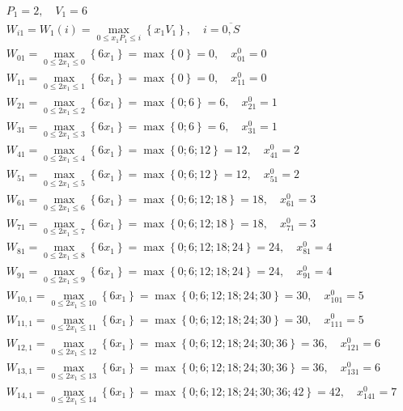 \begin{align*}
     & P_1 = 2, \quad V_1 = 6                                                                                                                         \\
     & W_{i1} = W_1(i) = \max\limits_{0 \leq x_1P_1 \leq i} \left\{x_1V_1\right\}, \quad i = \overline{0, S}                                          \\
     & W_{01} = \max\limits_{0 \leq 2x_1 \leq 0} \left\{6x_1\right\} = \max \left\{0\right\} = 0, \quad x_{01}^0 = 0                                  \\
     & W_{11} = \max\limits_{0 \leq 2x_1 \leq 1} \left\{6x_1\right\} = \max \left\{0\right\} = 0, \quad x_{11}^0 = 0                                  \\
     & W_{21} = \max\limits_{0 \leq 2x_1 \leq 2} \left\{6x_1\right\} = \max \left\{0; 6\right\} = 6, \quad x_{21}^0 = 1                               \\
     & W_{31} = \max\limits_{0 \leq 2x_1 \leq 3} \left\{6x_1\right\} = \max \left\{0; 6\right\} = 6, \quad x_{31}^0 = 1                               \\
     & W_{41} = \max\limits_{0 \leq 2x_1 \leq 4} \left\{6x_1\right\} = \max \left\{0; 6; 12\right\} = 12, \quad x_{41}^0 = 2                          \\
     & W_{51} = \max\limits_{0 \leq 2x_1 \leq 5} \left\{6x_1\right\} = \max \left\{0; 6; 12\right\} = 12, \quad x_{51}^0 = 2                          \\
     & W_{61} = \max\limits_{0 \leq 2x_1 \leq 6} \left\{6x_1\right\} = \max \left\{0; 6; 12; 18\right\} = 18, \quad x_{61}^0 = 3                      \\
     & W_{71} = \max\limits_{0 \leq 2x_1 \leq 7} \left\{6x_1\right\} = \max \left\{0; 6; 12; 18\right\} = 18, \quad x_{71}^0 = 3                      \\
     & W_{81} = \max\limits_{0 \leq 2x_1 \leq 8} \left\{6x_1\right\} = \max \left\{0; 6; 12; 18; 24\right\} = 24, \quad x_{81}^0 = 4                  \\
     & W_{91} = \max\limits_{0 \leq 2x_1 \leq 9} \left\{6x_1\right\} = \max \left\{0; 6; 12; 18; 24\right\} = 24, \quad x_{91}^0 = 4                  \\
     & W_{10, 1} = \max\limits_{0 \leq 2x_1 \leq 10} \left\{6x_1\right\} = \max \left\{0; 6; 12; 18; 24; 30\right\} = 30, \quad x_{101}^0 = 5         \\
     & W_{11, 1} = \max\limits_{0 \leq 2x_1 \leq 11} \left\{6x_1\right\} = \max \left\{0; 6; 12; 18; 24; 30\right\} = 30, \quad x_{111}^0 = 5         \\
     & W_{12, 1} = \max\limits_{0 \leq 2x_1 \leq 12} \left\{6x_1\right\} = \max \left\{0; 6; 12; 18; 24; 30; 36\right\} = 36, \quad x_{121}^0 = 6     \\
     & W_{13, 1} = \max\limits_{0 \leq 2x_1 \leq 13} \left\{6x_1\right\} = \max \left\{0; 6; 12; 18; 24; 30; 36\right\} = 36, \quad x_{131}^0 = 6     \\
     & W_{14, 1} = \max\limits_{0 \leq 2x_1 \leq 14} \left\{6x_1\right\} = \max \left\{0; 6; 12; 18; 24; 30; 36; 42\right\} = 42, \quad x_{141}^0 = 7
\end{align*}


